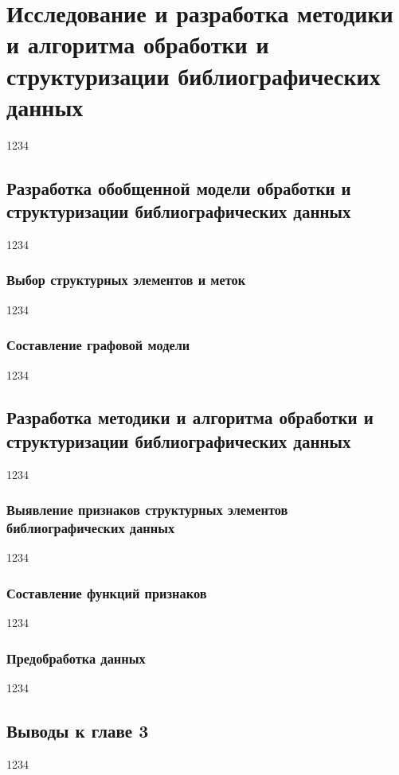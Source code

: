 \chapter{Исследование и разработка методики и алгоритма обработки и структуризации библиографических данных}
1234
\section{Разработка обобщенной модели обработки и структуризации библиографических данных}
1234
\subsection{Выбор структурных элементов и меток}
1234
\subsection{Составление графовой модели}
1234
\section{Разработка методики и алгоритма обработки и структуризации библиографических данных}
1234
\subsection{Выявление признаков структурных элементов библиографических данных}
1234
\subsection{Составление функций признаков}
1234
\subsection{Предобработка данных}
1234
\section*{Выводы к главе 3}
1234
